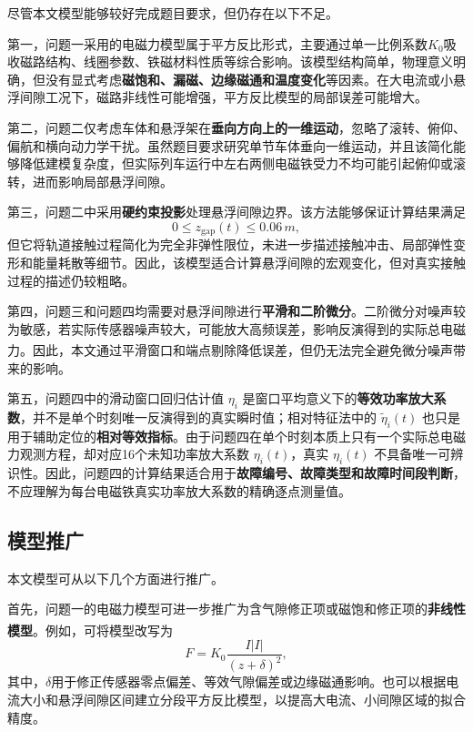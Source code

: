 \documentclass[a4paper]{nmmcm}
\newcommand{\upcite}[1]{\textsuperscript{\cite{#1}}}
\begin{document}
尽管本文模型能够较好完成题目要求，但仍存在以下不足。

第一，问题一采用的电磁力模型属于平方反比形式，主要通过单一比例系数$K_0$吸收磁路结构、线圈参数、铁磁材料性质等综合影响。该模型结构简单，物理意义明确，但没有显式考虑\textbf{磁饱和、漏磁、边缘磁通和温度变化}等因素。在大电流或小悬浮间隙工况下，磁路非线性可能增强，平方反比模型的局部误差可能增大。

第二，问题二仅考虑车体和悬浮架在\textbf{垂向方向上的一维运动}，忽略了滚转、俯仰、偏航和横向动力学干扰。虽然题目要求研究单节车体垂向一维运动，并且该简化能够降低建模复杂度，但实际列车运行中左右两侧电磁铁受力不均可能引起俯仰或滚转，进而影响局部悬浮间隙。

第三，问题二中采用\textbf{硬约束投影}处理悬浮间隙边界。该方法能够保证计算结果满足
\[
0\leq z_{\mathrm{gap}}(t)\leq 0.06\,m,
\]
但它将轨道接触过程简化为完全非弹性限位，未进一步描述接触冲击、局部弹性变形和能量耗散等细节。因此，该模型适合计算悬浮间隙的宏观变化，但对真实接触过程的描述仍较粗略。

第四，问题三和问题四均需要对悬浮间隙进行\textbf{平滑和二阶微分}。二阶微分对噪声较为敏感，若实际传感器噪声较大，可能放大高频误差，影响反演得到的实际总电磁力\upcite{1}。因此，本文通过平滑窗口和端点剔除降低误差，但仍无法完全避免微分噪声带来的影响。

第五，问题四中的滑动窗口回归估计值 $\eta_i$ 是窗口平均意义下的\textbf{等效功率放大系数}，并不是单个时刻唯一反演得到的真实瞬时值；相对特征法中的 $\tilde{\eta}_i(t)$ 也只是用于辅助定位的\textbf{相对等效指标}。由于问题四在单个时刻本质上只有一个实际总电磁力观测方程，却对应16个未知功率放大系数 $\eta_i(t)$，真实 $\eta_i(t)$ 不具备唯一可辨识性。因此，问题四的计算结果适合用于\textbf{故障编号、故障类型和故障时间段判断}，不应理解为每台电磁铁真实功率放大系数的精确逐点测量值。

\subsection{模型推广}

本文模型可从以下几个方面进行推广。

首先，问题一的电磁力模型可进一步推广为含气隙修正项或磁饱和修正项的\textbf{非线性模型}\upcite{2}\upcite{3}。例如，可将模型改写为
\begin{equation}
F=K_0\frac{I|I|}{(z+\delta)^2},
\end{equation}
其中，$\delta$用于修正传感器零点偏差、等效气隙偏差或边缘磁通影响。也可以根据电流大小和悬浮间隙区间建立分段平方反比模型，以提高大电流、小间隙区域的拟合精度。
\end{document}
